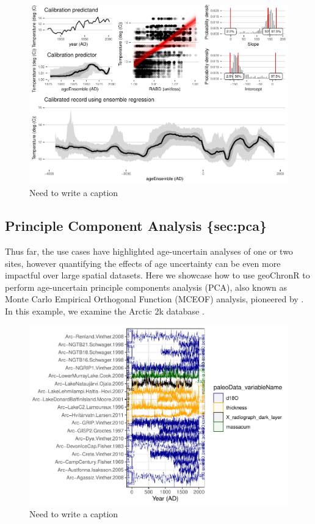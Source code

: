 \documentclass[gc, manuscript]{copernicus}
\begin{document}
\begin{figure}
\centering
\includegraphics{geoChronR-paper_files/figure-latex/regression-1.pdf}
\caption{\label{fig:regression}Need to write a caption}
\end{figure}

\subsection{Principle Component Analysis \{sec:pca\}}

Thus far, the use cases have highlighted age-uncertain analyses of one or two sites, however quantifying the effects of age uncertainty can be even more impactful over large spatial datasets.
Here we showcase how to use geoChronR to perform age-uncertain principle components analysis (PCA), also known as Monte Carlo Empirical Orthogonal Function (MCEOF) analysis, pioneered by \citet{anchukaitis2013mceof}.
In this example, we examine the Arctic 2k database \citep{McKayKaufman2014}.

\begin{figure}
\centering
\includegraphics{geoChronR-paper_files/figure-latex/unnamed-chunk-5-1.pdf}
\caption{\label{fig:unnamed-chunk-5}Need to write a caption}
\end{figure}
\end{document}
